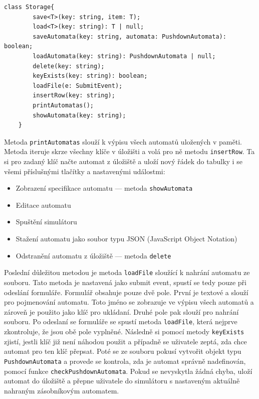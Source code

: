 \begin{lstlisting}[label=src:StorageClass, caption={Třída Storage}]
    class Storage{
        save<T>(key: string, item: T);
        load<T>(key: string): T | null;
        saveAutomata(key: string, automata: PushdownAutomata): boolean;
        loadAutomata(key: string): PushdownAutomata | null;
        delete(key: string);
        keyExists(key: string): boolean;
        loadFile(e: SubmitEvent);
        insertRow(key: string);
        printAutomatas();
        showAutomata(key: string);
    }
\end{lstlisting}

Metoda \texttt{printAutomatas} slouží k výpisu všech automatů uložených v paměti. Metoda iteruje skrze všechny klíče v úložišti a volá pro ně metodu \texttt{insertRow}. Ta si pro zadaný klíč načte automat z úložiště a uloží nový řádek do tabulky i se všemi příslušnými tlačítky a nastavenými událostmi:
\begin{itemize}
    \item Zobrazení specifikace automatu --- metoda \texttt{showAutomata}
    \item Editace automatu
    \item Spuštění simulátoru
    \item Stažení automatu jako soubor typu JSON (JavaScript Object Notation)
    \item Odstranění automatu z úložiště --- metoda \texttt{delete}
\end{itemize}


Poslední důležitou metodou je metoda \texttt{loadFile} sloužící k nahrání automatu ze souboru. Tato metoda je nastavená jako submit event, spustí se tedy pouze při odeslání formuláře. Formulář obsahuje pouze dvě pole. První je textové a slouží pro pojmenování automatu. Toto jméno se zobrazuje ve výpisu všech automatů a zároveň je použito jako klíč pro ukládaní. Druhé pole pak slouží pro nahrání souboru. Po odeslaní se formuláře se spustí metoda \texttt{loadFile}, která nejprve zkontroluje, že jsou obě pole vyplněné. Následně si pomocí metody \texttt{keyExists} zjistí, jestli klíč již není náhodou použit a případně se uživatele zeptá, zda chce automat pro ten klíč přepsat. Poté se ze souboru pokusí vytvořit objekt typu \texttt{PushdownAutomata} a provede se kontrola, zda je automat správně nadefinován, pomocí funkce \texttt{checkPushdownAutomata}. Pokud se nevyskytla žádná chyba, uloží automat do úložiště a přepne uživatele do simulátoru s nastaveným aktuálně nahraným zásobníkovým automatem.


